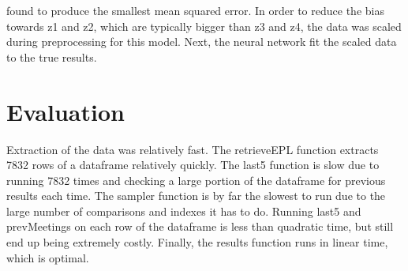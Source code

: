 \documentclass{article}
\begin{document}
found to produce the smallest mean squared error. In order to reduce the bias towards z1 and z2, which are typically bigger than z3 and z4, the data was scaled during preprocessing for this model. Next, the neural network fit the scaled data to the true results.

\section{Evaluation}
Extraction of the data was relatively fast. The retrieveEPL function extracts 7832 rows of a dataframe relatively quickly. The last5 function is slow due to running 7832 times and checking a large portion of the dataframe for previous results each time. The sampler function is by far the slowest to run due to the large number of comparisons and indexes it has to do. Running last5 and prevMeetings on each row of the dataframe is less than quadratic time, but still end up being extremely costly. Finally, the results function runs in linear time, which is optimal.
\end{document}
